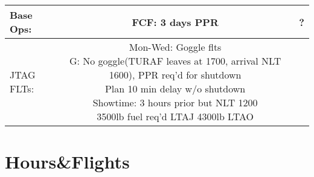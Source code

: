 \documentclass[11pt, oneside]{article}   	%
\begin{document}
{\begin{tabular}{l c r}
Base Ops:&\makecell{FCF: 3 days PPR \\ }&? \\ \hline
JTAG FLTs:&\makecell{Mon-Wed: Goggle flts\\ G: No goggle(TURAF leaves at 1700, arrival NLT 1600), PPR req'd for shutdown\\Plan 10 min delay w/o shutdown\\ Showtime: 3 hours prior but NLT 1200\\ 3500lb fuel req’d LTAJ 4300lb LTAO}
\end{tabular}
}

\section{Hours\&Flights}
\end{document}
